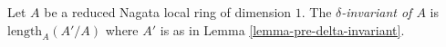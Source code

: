 \begin{definition}
\label{definition-delta-invariant-algebra}
Let $A$ be a reduced Nagata local ring of dimension $1$.
The {\it $\delta$-invariant of $A$} is $\text{length}_A(A'/A)$
where $A'$ is as in Lemma \ref{lemma-pre-delta-invariant}.
\end{definition}